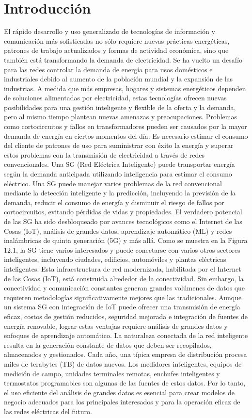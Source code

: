 \documentclass[crop=false]{standalone}
\begin{document}
\section{ Introducción}
El rápido desarrollo y uso generalizado de tecnologías de información y comunicación más sofisticadas no sólo requiere nuevas prácticas energéticas, patrones de trabajo actualizados y formas de actividad económica, sino que también está transformando la demanda de electricidad. Se ha vuelto un desafío para las redes controlar la demanda de energía para usos domésticos e industriales debido al aumento de la población mundial y la expansión de las industrias. A medida que más empresas, hogares y sistemas energéticos dependen de soluciones alimentadas por electricidad, estas tecnologías ofrecen nuevas posibilidades para una gestión inteligente y flexible de la oferta y la demanda, pero al mismo tiempo plantean nuevas amenazas y preocupaciones. Problemas como cortocircuitos y fallos en transformadores pueden ser causados por la mayor demanda de energía en ciertos momentos del día. Es necesario estimar el consumo del cliente de patrones de uso para suministrar con éxito la energía y superar estos problemas con la transmisión de electricidad a través de redes convencionales. Una SG (Red Eléctrica Inteligente) puede transportar energía según la demanda anticipada utilizando inteligencia para estimar el consumo eléctrico. Una SG puede manejar varios problemas de la red convencional mediante la detección inteligente y la predicción, incluyendo la previsión de la demanda, reducir el consumo de energía y disminuir el riesgo de fallos por cortocircuitos, evitando pérdidas de vidas y propiedades.
El verdadero potencial de las SG ha sido desbloqueado por avances tecnológicos como el Internet de las Cosas (IoT), análisis de grandes datos, aprendizaje automático (ML) y redes inalámbricas de quinta generación (5G) y más allá. Como se muestra en la Figura 12.1, la SG tiene varios interesados y puede conectarse con varios otros sectores inteligentes, incluyendo ciudades, edificios, automóviles y plantas eléctricas inteligentes. Esta infraestructura de red modernizada, habilitada por el Internet de las Cosas (IoT), está construida alrededor de la conectividad. Sin embargo, la conectividad y comunicación constantes generan grandes volúmenes de datos que requieren metodologías significativamente mejores que las tradicionales. Aunque un sistema SG con integración de IoT puede ofrecer una transmisión de energía eficaz, costos de gestión reducidos, seguridad mejorada e integración de fuentes de energía renovable, lograr estas ventajas requiere análisis de grandes datos y enfoques de aprendizaje automático. La naturaleza conectada de la red inteligente resulta en la generación constante de datos que deben ser recopilados, almacenados y gestionados. Cada año, una típica empresa de distribución procesa miles de terabytes (TB) de datos nuevos. Los medidores inteligentes, equipos de medición de campo, unidades terminales remotas, enchufes inteligentes y termostatos programables son algunas de las fuentes de estos datos. Por lo tanto, el uso eficiente del análisis de grandes datos es esencial para crear modelos de negocio adecuados para los principales interesados y para la operación eficaz de las redes eléctricas del futuro.
\end{document}
